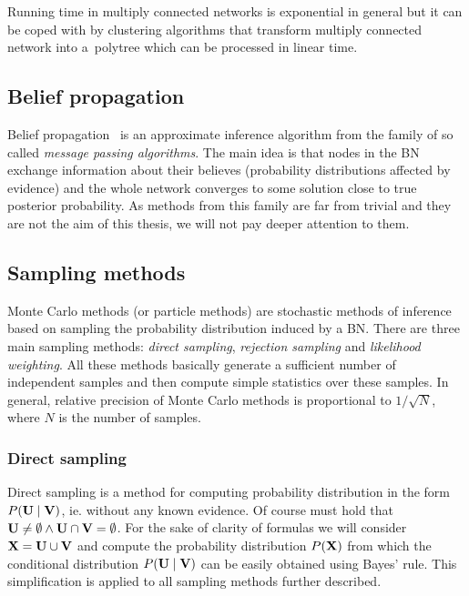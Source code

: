 \documentclass[english,cover]{fitthesis} %
\newcommand{\term}[1]{\emph{#1}}           %
\newcommand{\vars}[1]{{\bold{#1}}}         %
\newcommand{\note}[1]{{\color{green}#1}}
\begin{document}
Running time in multiply connected networks is exponential in general but it can be coped with by clustering algorithms that transform multiply connected network into a~polytree which can be processed in linear time.

\subsection{Belief propagation}
Belief propagation~\cite{pgm} is an approximate inference algorithm from the family of so called \term{message passing algorithms}. The main idea is that nodes in the BN exchange information about their believes (probability distributions affected by evidence) and the whole network converges to some solution close to true posterior probability. As methods from this family are far from trivial and they are not the aim of this thesis, we will not pay deeper attention to them.

\subsection{Sampling methods}
Monte Carlo methods (or particle methods) are stochastic methods of inference based on sampling the probability distribution induced by a BN. There are three main sampling methods: \term{direct sampling}, \term{rejection sampling} and \term{likelihood weighting}. All these methods basically generate a sufficient number of independent samples and then compute simple statistics over these samples. In general, relative precision of Monte Carlo methods is proportional to $1/\sqrt{N}$, where $N$ is the number of samples.

\subsubsection{Direct sampling}
Direct sampling is a method for computing probability distribution in the form $P(\vars{U} \mid \vars{V})$, ie. without any known evidence. Of course must hold that $\vars{U} \neq \emptyset \wedge \vars{U} \cap \vars{V} = \emptyset$. For the sake of clarity of formulas we will consider $\vars{X} = \vars{U} \cup \vars{V}$ and compute the probability distribution $P(\vars{X})$ from which the conditional distribution $P(\vars{U} \mid \vars{V})$ can be easily obtained using Bayes' rule. This simplification is applied to all sampling methods further described. 
\end{document}

